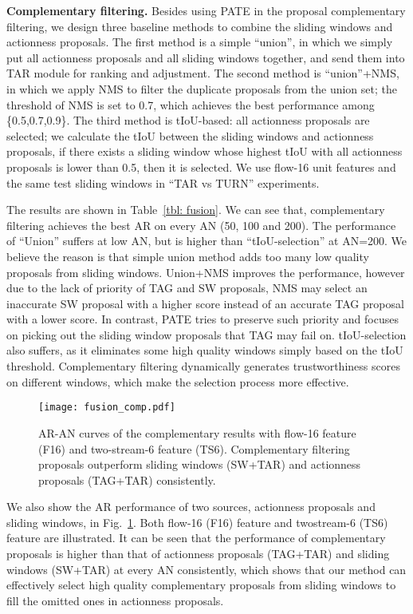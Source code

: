 \documentclass[runningheads]{llncs}
\begin{document}
\textbf{Complementary filtering.} Besides using PATE in the proposal complementary filtering, we design three baseline methods to combine the sliding windows and actionness proposals. The first method is a simple ``union'', in which we simply put all actionness proposals and all sliding windows together, and send them into TAR module for ranking and adjustment. The second method is ``union''+NMS, in which we apply NMS to filter the duplicate proposals from the union set; the threshold of NMS is set to 0.7, which achieves the best performance among \{0.5,0.7,0.9\}. The third method is tIoU-based: all actionness proposals are selected; we calculate the tIoU between the sliding windows and actionness proposals, if there exists a sliding window whose highest tIoU with all actionness proposals is lower than 0.5, then it is selected.  We use flow-16 unit features and the same test sliding windows in ``TAR vs TURN'' experiments. 

The results are shown in Table~\ref{tbl: fusion}. We can see that, complementary filtering achieves the best AR on every AN (50, 100 and 200). The performance of ``Union'' suffers at low AN, but is higher than ``tIoU-selection'' at AN=200. We believe the reason is that simple union method adds too many low quality proposals from sliding windows. Union+NMS improves the performance, however due to the lack of priority of TAG and SW proposals, NMS may select an inaccurate SW proposal with a higher score instead of an accurate TAG proposal with a lower score. In contrast, PATE tries to preserve such priority and focuses on picking out the sliding window proposals that TAG may fail on. tIoU-selection also suffers, as it eliminates some high quality windows simply based on the tIoU threshold. Complementary filtering dynamically generates trustworthiness scores on different windows, which make the selection process more effective. 


\begin{figure}[t]
  \centering
    \texttt{[image: fusion\_comp.pdf]}
    \caption{AR-AN curves of the complementary results with flow-16 feature (F16) and two-stream-6 feature (TS6). Complementary filtering proposals outperform sliding windows (SW+TAR) and actionness proposals (TAG+TAR) consistently.}
      \label{fig: fusioncomp}
\end{figure}

We also show the AR performance of two sources, actionness proposals and sliding windows, in Fig.~\ref{fig: fusioncomp}. Both flow-16 (F16) feature and twostream-6 (TS6) feature are illustrated. It can be seen that the performance of complementary proposals is higher than that of actionness proposals (TAG+TAR) and sliding windows (SW+TAR) at every AN consistently, which shows that our method can effectively select high quality complementary proposals from sliding windows to fill the omitted ones in actionness proposals. 
\end{document}
